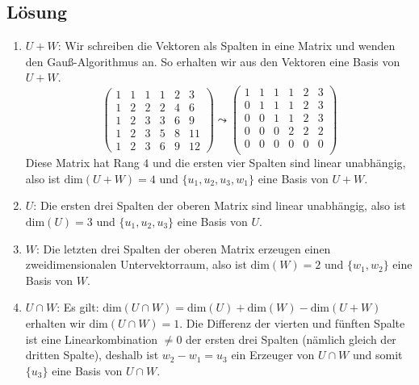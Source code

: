 \subsection{Lösung}
\begin{enumerate}
	\item \( U + W \): Wir schreiben die Vektoren als Spalten in eine Matrix und wenden den Gauß-Algorithmus an. So erhalten wir aus den Vektoren eine Basis von \( U + W \).
	\begin{equation*}
	 	\begin{pmatrix}
	 		1 & 1 & 1 & 1 & 2 & 3 \\
	 		1 & 2 & 2 & 2 & 4 & 6 \\
	 		1 & 2 & 3 & 3 & 6 & 9 \\
	 		1 & 2 & 3 & 5 & 8 & 11 \\
	 		1 & 2 & 3 & 6 & 9 & 12
	 	\end{pmatrix} \leadsto \begin{pmatrix}
	 		1 & 1 & 1 & 1 & 2 & 3 \\
	 		0 & 1 & 1 & 1 & 2 & 3 \\
	 		0 & 0 & 1 & 1 & 2 & 3 \\
	 		0 & 0 & 0 & 2 & 2 & 2 \\
	 		0 & 0 & 0 & 0 & 0 & 0 \\
	 	\end{pmatrix}
	 \end{equation*}
	 Diese Matrix hat Rang \( 4 \) und die ersten vier Spalten sind linear unabhängig, also ist \( \text{dim}(U+W) = 4 \) und \( \{ u_1, u_2, u_3, w_1 \} \) eine Basis von \( U+W \).

	 \item \( U \): Die ersten drei Spalten der oberen Matrix sind linear unabhängig, also ist \( \text{dim}(U) = 3 \) und \( \{ u_1, u_2, u_3 \} \) eine Basis von \( U \).

	 \item \( W \): Die letzten drei Spalten der oberen Matrix erzeugen einen zweidimensionalen Untervektorraum, also ist \( \text{dim}(W) = 2 \) und \( \{ w_1, w_2 \} \) eine Basis von \( W \).

	 \item \( U \cap W \): Es gilt: \( \text{dim}(U \cap W) = \text{dim}(U) + \text{dim}(W) - \text{dim}(U+W) \) erhalten wir \( \text{dim}(U \cap W) = 1 \). Die Differenz der vierten und fünften Spalte ist eine Linearkombination \( \neq 0 \) der ersten drei Spalten (nämlich gleich der dritten Spalte), deshalb ist \( w_2 - w_1 = u_3 \) ein Erzeuger von \( U \cap W \) und somit \( \{ u_3 \} \) eine Basis von \( U \cap W \).
\end{enumerate}

